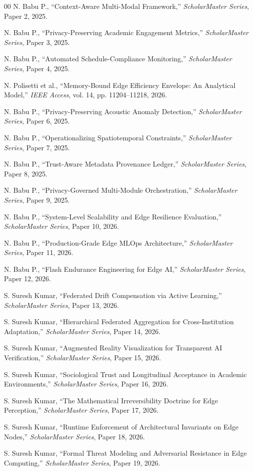 \documentclass[conference]{IEEEtran}
\begin{document}
\begin{thebibliography}{00}
 N. Babu P., ``Context-Aware Multi-Modal Framework,'' \textit{ScholarMaster Series}, Paper 2, 2025.

 N. Babu P., ``Privacy-Preserving Academic Engagement Metrics,'' \textit{ScholarMaster Series}, Paper 3, 2025.

 N. Babu P., ``Automated Schedule-Compliance Monitoring,'' \textit{ScholarMaster Series}, Paper 4, 2025.

 N. Polisetti et al., ``Memory-Bound Edge Efficiency Envelope: An Analytical Model,'' \textit{IEEE Access}, vol. 14, pp. 11204--11218, 2026.

 N. Babu P., ``Privacy-Preserving Acoustic Anomaly Detection,'' \textit{ScholarMaster Series}, Paper 6, 2025.

 N. Babu P., ``Operationalizing Spatiotemporal Constraints,'' \textit{ScholarMaster Series}, Paper 7, 2025.

 N. Babu P., ``Trust-Aware Metadata Provenance Ledger,'' \textit{ScholarMaster Series}, Paper 8, 2025.

 N. Babu P., ``Privacy-Governed Multi-Module Orchestration,'' \textit{ScholarMaster Series}, Paper 9, 2025.

 N. Babu P., ``System-Level Scalability and Edge Resilience Evaluation,'' \textit{ScholarMaster Series}, Paper 10, 2026.

 N. Babu P., ``Production-Grade Edge MLOps Architecture,'' \textit{ScholarMaster Series}, Paper 11, 2026.

 N. Babu P., ``Flash Endurance Engineering for Edge AI,'' \textit{ScholarMaster Series}, Paper 12, 2026.

 S. Suresh Kumar, ``Federated Drift Compensation via Active Learning,'' \textit{ScholarMaster Series}, Paper 13, 2026.

 S. Suresh Kumar, ``Hierarchical Federated Aggregation for Cross-Institution Adaptation,'' \textit{ScholarMaster Series}, Paper 14, 2026.

 S. Suresh Kumar, ``Augmented Reality Visualization for Transparent AI Verification,'' \textit{ScholarMaster Series}, Paper 15, 2026.

 S. Suresh Kumar, ``Sociological Trust and Longitudinal Acceptance in Academic Environments,'' \textit{ScholarMaster Series}, Paper 16, 2026.

 S. Suresh Kumar, ``The Mathematical Irreversibility Doctrine for Edge Perception,'' \textit{ScholarMaster Series}, Paper 17, 2026.

 S. Suresh Kumar, ``Runtime Enforcement of Architectural Invariants on Edge Nodes,'' \textit{ScholarMaster Series}, Paper 18, 2026.

 S. Suresh Kumar, ``Formal Threat Modeling and Adversarial Resistance in Edge Computing,'' \textit{ScholarMaster Series}, Paper 19, 2026.

\end{thebibliography}
\end{document}
